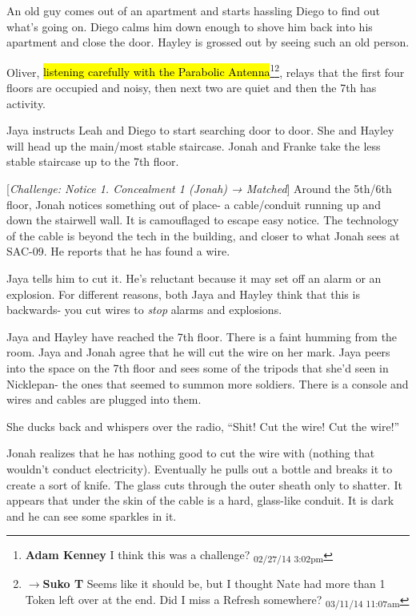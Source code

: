 An old guy comes out of an apartment and starts hassling Diego to find out what's going on.  Diego calms him down enough to shove him back into his apartment and close the door.  Hayley is grossed out by seeing such an old person.



Oliver, \hl{listening carefully with the Parabolic Antenna}\footnote{\textbf{Adam Kenney }I think this was a challenge? \textsubscript{02/27/14 3:02pm}}\footnote{$\rightarrow$\textbf{Suko T }Seems like it should be, but I thought Nate had more than 1 Token left over at the end.  Did I miss a Refresh somewhere? \textsubscript{03/11/14 11:07am}}, relays that the first four floors are occupied and noisy, then next two are quiet and then the 7th has activity.  



Jaya instructs Leah and Diego to start searching door to door.  She and Hayley will head up the main/most stable staircase.  Jonah and Franke take the less stable staircase up to the 7th floor.



{[}\textit{Challenge: Notice 1. Concealment 1 (Jonah) → Matched}{]} Around the 5th/6th floor, Jonah notices something out of place- a cable/conduit running up and down the stairwell wall.  It is camouflaged to escape easy notice.  The technology of the cable is beyond the tech in the building, and closer to what Jonah sees at SAC-09.  He reports that he has found a wire.



Jaya tells him to cut it.  He's reluctant because it may set off an alarm or an explosion.  For different reasons, both Jaya and Hayley think that this is backwards- you cut wires to \textit{stop }alarms and explosions.



Jaya and Hayley have reached the 7th floor.  There is a faint humming from the room.  Jaya and Jonah agree that he will cut the wire on her mark.  Jaya peers into the space on the 7th floor and sees some of the tripods that she'd seen in Nicklepan- the ones that seemed to summon more soldiers.  There is a console and wires and cables are plugged into them.

She ducks back and whispers over the radio, ``Shit!  Cut the wire!  Cut the wire!''



Jonah realizes that he has nothing good to cut the wire with (nothing that wouldn't conduct electricity). Eventually he pulls out a bottle and breaks it to create a sort of knife.  The glass cuts through the outer sheath only to shatter.  It appears that under the skin of the cable is a hard, glass-like conduit.  It is dark and he can see some sparkles in it.



